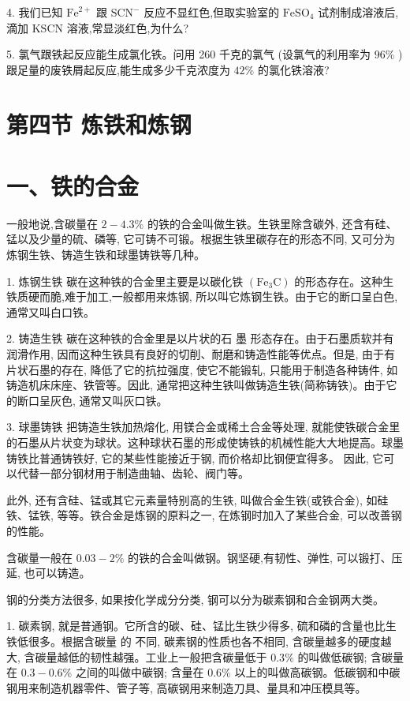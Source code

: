 \documentclass[10pt]{article}
\begin{document}
4. 我们已知 \({\mathrm{{Fe}}}^{2 + }\) 跟 \({\mathrm{{SCN}}}^{ - }\) 反应不显红色,但取实验室的 \({\mathrm{{FeSO}}}_{4}\) 试剂制成溶液后,滴加 \(\mathrm{{KSCN}}\) 溶液,常显淡红色,为什么?

5. 氯气跟铁起反应能生成氯化铁。问用 260 千克的氯气 (设氯气的利用率为 \({96}\%\) ) 跟足量的废铁屑起反应,能生成多少千克浓度为 \({42}\%\) 的氯化铁溶液?

\section*{第四节 炼铁和炼钢}

\section*{一、铁的合金}

一般地说,含碳量在 \(2 - {4.3}\%\) 的铁的合金叫做生铁。生铁里除含碳外, 还含有硅、锰以及少量的硫、磷等, 它可铸不可锻。根据生铁里碳存在的形态不同, 又可分为炼钢生铁、铸造生铁和球墨铸铁等几种。

1. 炼钢生铁 碳在这种铁的合金里主要是以碳化铁 \(\left( {{\mathrm{{Fe}}}_{3}\mathrm{C}}\right)\) 的形态存在。这种生铁质硬而脆,难于加工,一般都用来炼钢, 所以叫它炼钢生铁。由于它的断口呈白色, 通常又叫白口铁。

2. 铸造生铁 碳在这种铁的合金里是以片状的石 墨 形态存在。由于石墨质软并有润滑作用, 因而这种生铁具有良好的切削、耐磨和铸造性能等优点。但是, 由于有片状石墨的存在, 降低了它的抗拉强度, 使它不能锻轧, 只能用于制造各种铸件, 如铸造机床床座、铁管等。因此, 通常把这种生铁叫做铸造生铁(简称铸铁)。由于它的断口呈灰色, 通常又叫灰口铁。

3. 球墨铸铁 把铸造生铁加热熔化, 用镁合金或稀土合金等处理, 就能使铁碳合金里的石墨从片状变为球状。这种球状石墨的形成使铸铁的机械性能大大地提高。球墨铸铁比普通铸铁好, 它的某些性能接近于钢, 而价格却比钢便宜得多。 因此, 它可以代替一部分钢材用于制造曲轴、齿轮、阀门等。

此外, 还有含硅、锰或其它元素量特别高的生铁, 叫做合金生铁(或铁合金), 如硅铁、锰铁, 等等。铁合金是炼钢的原料之一, 在炼钢时加入了某些合金, 可以改善钢的性能。

含碳量一般在 \({0.03} - 2\%\) 的铁的合金叫做钢。钢坚硬,有韧性、弹性, 可以锻打、压延, 也可以铸造。

钢的分类方法很多, 如果按化学成分分类, 钢可以分为碳素钢和合金钢两大类。

1. 碳素钢, 就是普通钢。它所含的碳、硅、锰比生铁少得多, 硫和磷的含量也比生铁低很多。根据含碳量 的 不同, 碳素钢的性质也各不相同, 含碳量越多的硬度越大, 含碳量越低的韧性越强。工业上一般把含碳量低于 \({0.3}\%\) 的叫做低碳钢; 含碳量在 \({0.3} - {0.6}\%\) 之间的叫做中碳钢; 含量在 \({0.6}\%\) 以上的叫做高碳钢。低碳钢和中碳钢用来制造机器零件、管子等, 高碳钢用来制造刀具、量具和冲压模具等。
\end{document}
